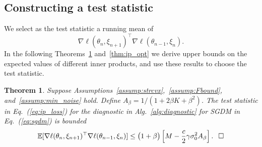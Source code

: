 \documentclass[conference]{IEEEtran}
\newtheorem{theorem}{Theorem}
\begin{document}
\subsection{Constructing a test statistic}

We select as the test statistic a running mean of 
\begin{equation}
\label{eq:ip_loss}
\nabla \ell ( \theta_{n}, \xi_{n+1})^\top \nabla \ell ( \theta_{n-1}, \xi_{n} ).
\end{equation}
In the following Theorems~\ref{thm:ip_exp_bd} and~\ref{thm:ip_opt} we derive upper bounds on the expected values of different inner products, 
and use these results to choose the test statistic.

\begin{theorem}
\label{thm:ip_exp_bd}
Suppose Assumptions~\ref{assump:strcvx},~\ref{assump:Fbound}, and~\ref{assump:min_noise} hold. 
Define $A_\beta =  1 / (1 + 2 \beta K + \beta^2)$.
The test statistic in Eq.~(\ref{eq:ip_loss}) for the  diagnostic in Alg.~\ref{alg:diagnostic} for SGDM in Eq.~(\ref{eq:sgdm}) is bounded 
\begin{equation*}
\mathbb{E} [ \nabla \ell ( \theta_n, \xi_{n+1} )^\top \nabla \ell ( \theta_{n-1}, \xi_n ) ] 
\leq \big( 1 + \beta \big) \left[ M - \frac{c}{2} \gamma \sigma_0^2 A_\beta \right].\hspace{0.1in}\Box
\end{equation*}
\end{theorem}

\vspace{0.1in}
\end{document}
